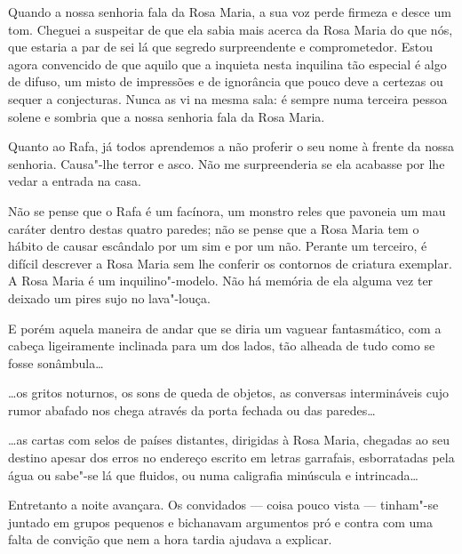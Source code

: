 Quando a nossa senhoria fala da Rosa Maria, a sua voz perde firmeza e
desce um tom. Cheguei a suspeitar de que ela sabia mais acerca da Rosa
Maria do que nós, que estaria a par de sei lá que segredo surpreendente
e comprometedor. Estou agora convencido de que aquilo que a inquieta
nesta inquilina tão especial é algo de difuso, um misto de impressões e
de ignorância que pouco deve a certezas ou sequer a conjecturas. Nunca
as vi na mesma sala: é sempre numa terceira pessoa solene e sombria que
a nossa senhoria fala da Rosa Maria.

Quanto ao Rafa, já todos aprendemos a não proferir o seu nome à frente
da nossa senhoria. Causa"-lhe terror e asco. Não me surpreenderia se ela
acabasse por lhe vedar a entrada na casa.

Não se pense que o Rafa é um facínora, um monstro reles que pavoneia um
mau caráter dentro destas quatro paredes;
não se pense que a Rosa Maria tem o hábito de causar escândalo por um
sim e por um não. Perante um terceiro, é difícil descrever a Rosa Maria
sem lhe conferir os contornos de criatura exemplar. A Rosa Maria é um
inquilino"-modelo. Não há memória de ela alguma vez ter deixado um pires
sujo no lava"-louça.

E porém aquela maneira de andar que se diria um vaguear fantasmático,
com a cabeça ligeiramente inclinada para um dos lados, tão alheada de
tudo como se fosse sonâmbula\ldots{}

\ldots{}os gritos noturnos, os sons de queda de objetos, as conversas
intermináveis cujo rumor abafado nos chega através da porta fechada ou
das paredes\ldots{}

\ldots{}as cartas com selos de países distantes, dirigidas à Rosa Maria,
chegadas ao seu destino apesar dos erros no endereço escrito em letras
garrafais, esborratadas pela água ou sabe"-se lá que fluidos, ou numa
caligrafia minúscula e intrincada\ldots{}

Entretanto a noite avançara. Os convidados --- coisa pouco vista ---
tinham"-se juntado em grupos pequenos e bichanavam argumentos pró e
contra com uma falta de convição que nem a hora tardia ajudava a
explicar.

